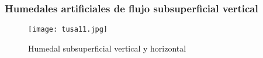 \subsubsection{Humedales artificiales de flujo subsuperficial vertical}
\begin{figure}[h!]
    \centering
      \texttt{[image: tusa11.jpg]}
      \caption{Humedal subsuperficial vertical y horizontal}
      \label{tusa11}
\end{figure}
























































